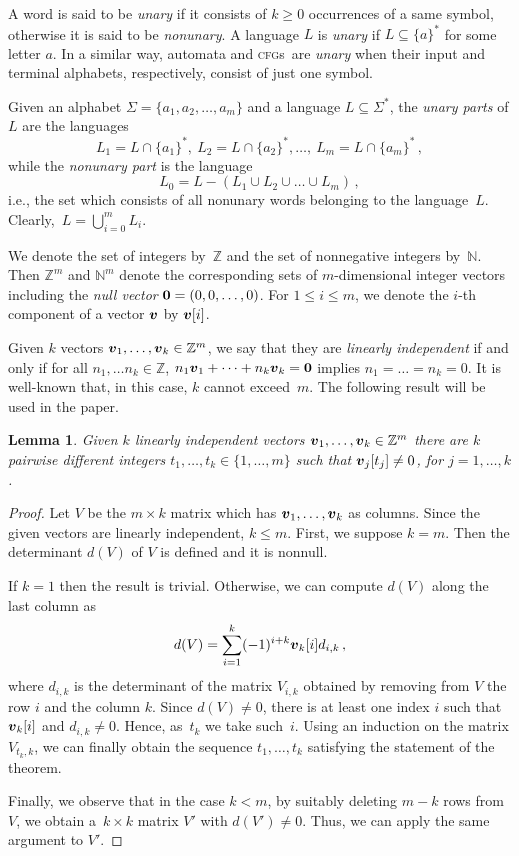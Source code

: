\documentclass[11pt]{article}
\newcommand*{\cfgs}{\textsc{cfg}s}
\def\Vec#1{\mbox{\boldmath $#1$}}
\newtheorem{lemma}[theorem]{Lemma}
\begin{document}
\medskip
A word is said to be \emph{unary} if it consists of $k\geq 0$ occurrences of a same symbol,
otherwise it is said to be \emph{nonunary}.
A language $L$ is \emph{unary} if $L\subseteq\{a\}^*$ for some letter $a$.
In a similar way, automata and \cfgs\ are \emph{unary} when their input and terminal alphabets, respectively, consist of
just one symbol.

Given an alphabet $\Sigma=\{a_1,a_2,\ldots,a_m\}$ and a language $L\subseteq\Sigma^*$,
the \emph{unary parts} of $L$ are the  languages
\[
L_1=L\cap\{a_1\}^*,~L_2=L\cap\{a_2\}^*,\ldots,~L_m=L\cap\{a_m\}^*\,,
\]
while the \emph{nonunary part} is the language
\[
L_0=L-\left(L_1\cup L_2\cup\ldots\cup L_m\right)\,,
\]
i.e., the set which consists of all nonunary words belonging to the language~$L$.
Clearly,~$L=\bigcup_{i=0}^{m}L_i$.


\medskip

We denote the set of integers by~$\mathbb{Z}$ and the set of nonnegative integers by~$\mathbb{N}$.
Then $\mathbb{Z}^m$ and $\mathbb{N}^m$ denote the corresponding sets of $m$-dimensional integer vectors 
including the {\it null vector} $\Vec{0} = (0, 0, \ldots, 0)$. 
For $1 \le i \le m$, we denote the $i$-th component of a vector $\Vec{v}$ by $\Vec{v}[i]$. 

Given $k$ vectors $\Vec{v}_1,\ldots,\Vec{v}_k\in\mathbb{Z}^m$, we say that they are \emph{linearly independent}
if and only if for all $n_1,\dots n_k\in\mathbb{Z}$, 
$n_1\Vec{v}_1+\cdots+n_k\Vec{v}_k=\Vec{0}$ implies $n_1=\ldots=n_k=0$.
It is well-known that, in this case, $k$ cannot exceed~$m$.
The following result will be used in the paper.

\begin{lemma}\label{lem:indep}
  Given $k$ linearly independent vectors $\Vec{v}_1,\ldots,\Vec{v}_k\in\mathbb{Z}^m$ there are $k$ pairwise
  different integers $t_1,\ldots,t_k\in\{1,\ldots,m\}$ such that $\Vec{v}_j[t_j]\neq 0$, for $j=1,\ldots,k$.
\end{lemma}
\begin{proof}
  Let $V$ be the $m\times k$ matrix which has $\Vec{v}_1,\ldots,\Vec{v}_k$ as columns. Since the given vectors
  are linearly independent, $k\le m$. 
  First, we suppose $k=m$. Then the determinant $d(V)$ of $V$ is defined and it is nonnull. 
  
  If $k=1$ then the result is trivial.
  Otherwise, we can compute $d(V)$ along the last column as
  \[
  d(V)=\sum_{i=1}^k(-1)^{i+k}\Vec{v}_k[i]d_{i,k}\,,
  \] 
  where $d_{i,k}$ is the determinant of the matrix $V_{i,k}$ obtained by
  removing from $V$ the row $i$ and the column $k$. Since $d(V)\neq 0$, there is at least one index $i$ such that
  $\Vec{v}_k[i]$ and $d_{i,k}\neq 0$. Hence, as~$t_k$ we take such~$i$.
  Using an induction on the matrix $V_{t_k,k}$, we can finally obtain the sequence $t_1,\ldots,t_k$ 
  satisfying the statement of the theorem.
  
  Finally, we observe that in the case $k<m$, by suitably deleting $m-k$ rows from $V$, we obtain
  a~$k\times k$ matrix $V'$ with $d(V')\neq 0$. Thus, we can apply the same argument to $V'$.
\end{proof}
\end{document}
